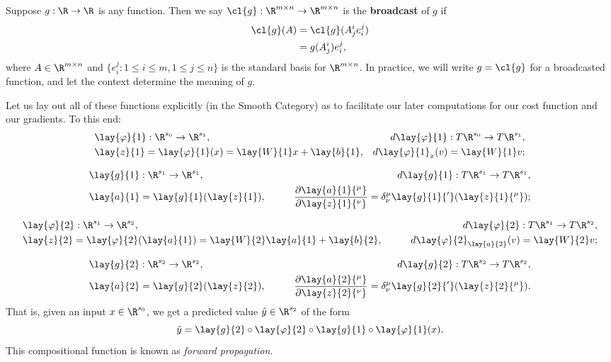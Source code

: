 \begin{defn}
	Suppose $g:\R\to\R$ is any function.  Then we say $\cl{g}:\R^{m\times n}\to\R^{m\times n}$ is the \textbf{broadcast} of $g$ if
	\begin{align*}
		\cl{g}(A)&=\cl{g}(A^i_je_i^j)\\
		&=g(A^i_j)e_i^j,
	\end{align*}
	where $A\in\R^{m\times n}$ and $\{e_i^j:1\leq i\leq m, 1\leq j\leq n\}$ is the standard basis for $\R^{m\times n}$.  In practice, we will write $g=\cl{g}$ for a broadcasted function, and let the context determine the meaning of $g$.
\end{defn}

Let us lay out all of these functions explicitly (in the Smooth Category) as to facilitate our later computations for our cost function and our gradients.
To this end:
\begin{align*}
	&\lay{\varphi}{1}:\R^{s_0}\to\R^{s_1},\qquad &d\lay{\varphi}{1}:T\R^{s_0}\to T\R^{s_1},\\
	&\lay{z}{1}=\lay{\varphi}{1}(x)=\lay{W}{1}x+\lay{b}{1},&d\lay{\varphi}{1}_x(v)=\lay{W}{1}v;
\end{align*}

\begin{align*}
	&\lay{g}{1}:\R^{s_1}\to\R^{s_1},\qquad &
	d\lay{g}{1}:T\R^{s_1}\to T\R^{s_1},\\
	&\lay{a}{1}=\lay{g}{1}(\lay{z}{1}),\qquad 
	&\frac{\partial\lay{a}{1}{^\mu}}{\partial \lay{z}{1}{^\nu}}=\delta^\mu_\nu\lay{g}{1}{'}(\lay{z}{1}{^\mu});
\end{align*}

\begin{align*}
&\lay{\varphi}{2}:\R^{s_1}\to\R^{s_2},\qquad	
&d\lay{\varphi}{2}:T\R^{s_1}\to T\R^{s_2},\\
&\lay{z}{2}=\lay{\varphi}{2}(\lay{a}{1})=\lay{W}{2}\lay{a}{1}+\lay{b}{2},\qquad &d\lay{\varphi}{2}_{\lay{a}{2}}(v)=\lay{W}{2}v;
\end{align*}

\begin{align*}
	&\lay{g}{2}:\R^{s_2}\to\R^{s_2},\qquad 
	&d\lay{g}{2}:T\R^{s_2}\to T\R^{s_2},\\
	&\lay{a}{2}=\lay{g}{2}(\lay{z}{2}),\qquad 
	&\frac{\partial\lay{a}{2}{^\mu}}{\partial \lay{z}{2}{^\nu}}=\delta^\mu_\nu\lay{g}{2}{'}(\lay{z}{2}{^\mu}).
\end{align*}
That is, given an input $x\in\R^{s_0}$, we get a predicted value $\hat{y}\in\R^{s_2}$ of the form
$$\hat{y}=\lay{g}{2}\circ\lay{\varphi}{2}\circ\lay{g}{1}\circ\lay{\varphi}{1}(x).$$
This compositional function is known as \textit{forward propagation}.

